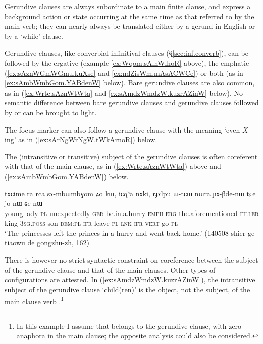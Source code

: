 Gerundive clauses are always subordinate to a main finite clause, and express a background action or state occurring at the same time as that referred to by the main verb; they can nearly always be translated either by a gerund in English or by a `while' clause.

Gerundive clauses, like converbial infinitival clauses (§\ref{sec:inf.converb}), can be followed by the ergative  (example \ref{ex:Wqom.sAlhWlhoR} above), the emphatic  (\ref{ex:sAznWGmWGmu.kuXse} and \ref{ex:ndZisWm.mAsACWCe}) or both (as in \ref{ex:sAmbWmbGom.YABdenW} below). Bare gerundive clauses are also common, as in (\ref{ex:Wrte.sAznWtWta} and \ref{ex:sAmdzWmdzW.kuzrAZinW} below). No semantic difference between bare gerundive clauses and gerundive clauses followed by  or  can be brought to light. 

The focus marker  can also follow a gerundive clause with the meaning `even $X$ing' as in (\ref{ex:sArNgWrNgW.tWkArnoR}) below.

The (intransitive or transitive) subject of the gerundive clauses is often coreferent with that of the main clause, as in (\ref{ex:Wrte.sAznWtWta}) above and (\ref{ex:sAmbWmbGom.YABdenW}) below.

\begin{exe}
\ex \label{ex:sAmbWmbGom.YABdenW}
\gll tɤɕime ra rca sɤ-mbɯ\redp{}mbɣom ʑo kɯ, iɕqʰa nɤki, rɟɤlpu ɯ-tɕɯ nɯra ɲɤ-βde-nɯ tɕe jo-nɯ-ɕe-nɯ \\
young.lady \textsc{pl} unexpectedly \textsc{ger}-be.in.a.hurry \textsc{emph} \textsc{erg} the.aforementioned \textsc{filler} king \textsc{3sg}.\textsc{poss}-son \textsc{dem}:\textsc{pl} \textsc{ifr}-leave-\textsc{pl} \textsc{lnk} \textsc{ifr}-\textsc{vert}-go-\textsc{pl} \\
\glt `The princesses left the princes in a hurry and went back home.' (140508 shier ge tiaowu de gongzhu-zh, 162)
\end{exe}

There is however no strict syntactic constraint on coreference between the subject of the gerundive clause and that of the main clauses. Other types of configurations are attested. In (\ref{ex:sAmdzWmdzW.kuzrAZinW}), the intransitive subject of the gerundive clause  `child(ren)' is the object, not the subject, of the main clause verb .\footnote{In this example I assume that  belongs to the gerundive clause, with zero anaphora in the main clause; the opposite analysis could also be considered.}

